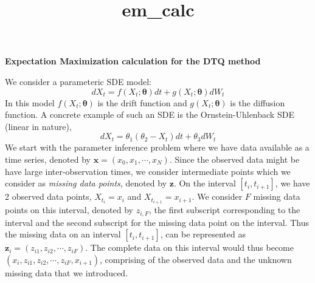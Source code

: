 \documentclass[12pt]{article}
\newcommand{\bx}{\ensuremath{\mathbf{x}}}
\newcommand{\bz}{\ensuremath{\mathbf{z}}}
\newcommand{\btheta}{\ensuremath{\boldsymbol{\theta}}}
\begin{document}
\vspace*{-15mm}
\title{em_calc}
\begin{center}
\Large\textbf{Expectation Maximization calculation for the DTQ method} \\
\normalsize
\end{center}
We consider a parameteric SDE model:
\begin{equation}
dX_t = f(X_t; \btheta) dt + g(X_t; \btheta) dW_t
\end{equation}
In this model $f(X_t; \btheta)$ is the drift function and $g(X_t; \btheta)$ is the diffusion function. A concrete example of such an SDE is the Ornstein-Uhlenback SDE (linear in nature),
\begin{equation}
dX_t = \theta_1 (\theta_2 - X_t) dt + \theta_3 dW_t
\end{equation}
We start with the parameter inference problem where we have data available as a time series, denoted by $\bx = (x_0, x_1, \cdots, x_N)$. Since the observed data might be have large inter-observation times, we consider intermediate points which we consider as \textit{missing data points}, denoted by $\bz$. On the interval $[t_i, t_{i+1}]$, we have 2 observed data points, $X_{t_i} = x_i$ and $X_{t_{i+1}} = x_{i+1}$. We consider $F$ missing data points on this interval, denoted by $z_{i,F}$, the first subscript corresponding to the interval and the second subscript for the missing data point on the interval. Thus the missing data on an interval $[t_i, t_{i+1}]$, can be represented as $\bz_i = (z_{i1}, z_{i2}, \cdots, z_{iF})$. The complete data on this interval would thus become $(x_i, z_{i1}, z_{i2}, \cdots, z_{iF}, x_{i+1})$, comprising of the observed data and the unknown missing data that we introduced.
\end{document}
